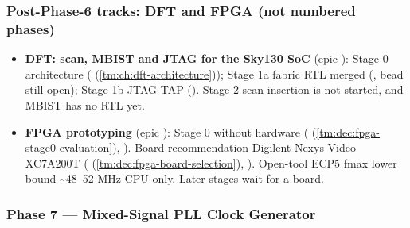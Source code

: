 \subsubsection{Post-Phase-6 tracks: DFT and FPGA (not numbered phases)}\label{cr:status:roadmap:post-phase-6-tracks-dft-and-fpga-not-numbered-phases}

\begin{record}

\begin{itemize}
\tightlist
\item
  \textbf{DFT: scan, MBIST and JTAG for the Sky130 SoC} (epic
  ): Stage 0 architecture \ok{}
  ( (\cref{tm:ch:dft-architecture})); Stage 1a fabric RTL merged
  (, bead  still open); Stage 1b JTAG TAP \ok{} (). Stage 2 scan insertion is not started, and MBIST has no RTL
  yet.
\item
  \textbf{FPGA prototyping} (epic ): Stage 0 \ok{} without
  hardware ( (\cref{tm:dec:fpga-stage0-evaluation}), ). Board
  recommendation Digilent Nexys Video XC7A200T
  ( (\cref{tm:dec:fpga-board-selection}), ). Open-tool ECP5 fmax
  lower bound \textasciitilde48--52 MHz CPU-only. Later stages wait for
  a board.
\end{itemize}

\end{record}

\subsubsection{Phase 7 --- Mixed-Signal PLL Clock Generator}\label{cr:status:roadmap:phase-7-mixed-signal-pll-clock-generator}

